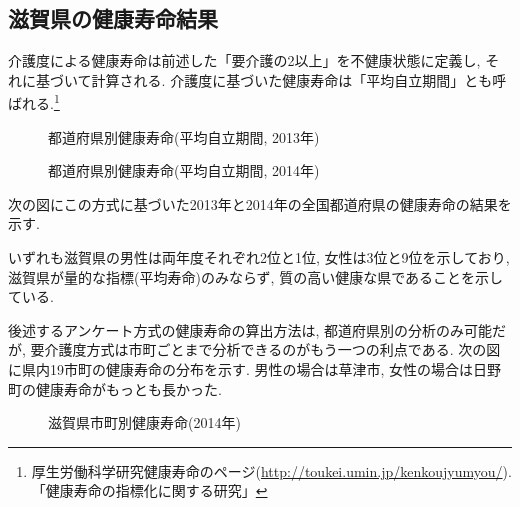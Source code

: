 
%



%
%
%
\subsection{滋賀県の健康寿命結果}
介護度による健康寿命は前述した「要介護の2以上」を不健康状態に定義し, それに基づいて計算される. 介護度に基づいた健康寿命は「平均自立期間」とも呼ばれる.\footnote{厚生労働科学研究健康寿命のページ(\url{http://toukei.umin.jp/kenkoujyumyou/}).
	「健康寿命の指標化に関する研究」
}
\begin{figure}[h!]
	\begin{center}
		\caption{都道府県別健康寿命(平均自立期間, 2013年)}\label{fig1}
	\end{center}
\end{figure}
\begin{figure}[h!]
	\begin{center}
		\caption{都道府県別健康寿命(平均自立期間, 2014年)}\label{fig1}
	\end{center}
\end{figure}
次の図にこの方式に基づいた2013年と2014年の全国都道府県の健康寿命の結果を示す.

いずれも滋賀県の男性は両年度それぞれ2位と1位, 女性は3位と9位を示しており, 滋賀県が量的な指標(平均寿命)のみならず, 質の高い健康な県であることを示している.

後述するアンケート方式の健康寿命の算出方法は,
都道府県別の分析のみ可能だが,
要介護度方式は市町ごとまで分析できるのがもう一つの利点である.
次の図に県内19市町の健康寿命の分布を示す. 男性の場合は草津市, 女性の場合は日野町の健康寿命がもっとも長かった.

\begin{figure}[h!]
	\begin{center}
		\caption{滋賀県市町別健康寿命(2014年)}\label{fig1}
	\end{center}
\end{figure}



